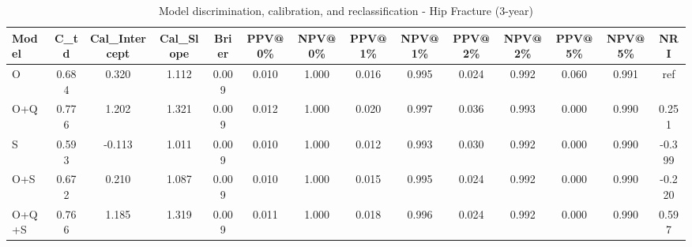 \begin{table}[htbp]
\centering
\small
\caption{Model discrimination, calibration, and reclassification - Hip Fracture (3-year)}
\label{tab:perf_pd_3y}
\begin{tabular}{lccccccccccccc}
\toprule
Model & C\_td & Cal\_Intercept & Cal\_Slope & Brier & PPV@0\% & NPV@0\% & PPV@1\% & NPV@1\% & PPV@2\% & NPV@2\% & PPV@5\% & NPV@5\% & NRI \\
\midrule
O & 0.684 & 0.320 & 1.112 & 0.009 & 0.010 & 1.000 & 0.016 & 0.995 & 0.024 & 0.992 & 0.060 & 0.991 & ref \\
O+Q & 0.776 & 1.202 & 1.321 & 0.009 & 0.012 & 1.000 & 0.020 & 0.997 & 0.036 & 0.993 & 0.000 & 0.990 & 0.251 \\
S & 0.593 & -0.113 & 1.011 & 0.009 & 0.010 & 1.000 & 0.012 & 0.993 & 0.030 & 0.992 & 0.000 & 0.990 & -0.399 \\
O+S & 0.672 & 0.210 & 1.087 & 0.009 & 0.010 & 1.000 & 0.015 & 0.995 & 0.024 & 0.992 & 0.000 & 0.990 & -0.220 \\
O+Q+S & 0.766 & 1.185 & 1.319 & 0.009 & 0.011 & 1.000 & 0.018 & 0.996 & 0.024 & 0.992 & 0.000 & 0.990 & 0.597 \\
\bottomrule
\end{tabular}
\end{table}